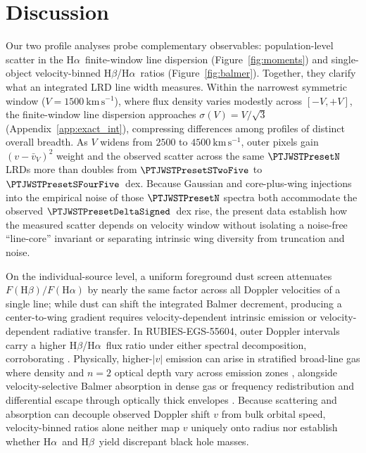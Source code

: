 \documentclass[twocolumn]{aastex631}
\newcommand{\Ha}{\ensuremath{\mathrm{H}\alpha}}
\newcommand{\Hb}{\ensuremath{\mathrm{H}\beta}}
\newcommand{\kms}{\ensuremath{\mathrm{km\,s^{-1}}}}
\newcommand{\sigV}{\ensuremath{\sigma(V)}}
\begin{document}
\section{Discussion}
\label{sec:discussion}

Our two profile analyses probe complementary observables: population-level scatter in the \Ha\ finite-window line dispersion (Figure~\ref{fig:moments}) and single-object velocity-binned \Hb/\Ha\ ratios (Figure~\ref{fig:balmer}). Together, they clarify what an integrated LRD line width measures. Within the narrowest symmetric window ($V = 1500~\kms$), where flux density varies modestly across $[-V, +V]$, the finite-window line dispersion approaches $\sigV = V/\sqrt{3}$ (Appendix~\ref{app:exact_int}), compressing differences among profiles of distinct overall breadth. As $V$ widens from $2500$ to $4500~\kms$, outer pixels gain $(v - \bar{v}_V)^2$ weight and the observed scatter across the same $\PTJWSTPresetN$ LRDs more than doubles from $\PTJWSTPresetSTwoFive$ to $\PTJWSTPresetSFourFive$~dex. Because Gaussian and core-plus-wing injections into the empirical noise of those $\PTJWSTPresetN$ spectra both accommodate the observed $\PTJWSTPresetDeltaSigned$~dex rise, the present data establish how the measured scatter depends on velocity window without isolating a noise-free ``line-core'' invariant or separating intrinsic wing diversity from truncation and noise.

On the individual-source level, a uniform foreground dust screen attenuates $F(\Hb)/F(\Ha)$ by nearly the same factor across all Doppler velocities of a single line; while dust can shift the integrated Balmer decrement, producing a center-to-wing gradient requires velocity-dependent intrinsic emission or velocity-dependent radiative transfer. In RUBIES-EGS-55604, outer Doppler intervals carry a higher \Hb/\Ha\ flux ratio under either spectral decomposition, corroborating \citet{Chen2026}. Physically, higher-$|v|$ emission can arise in stratified broad-line gas where density and $n=2$ optical depth vary across emission zones \citep{OsterbrockFerland2006,InayoshiMaiolino2025,Chen2026,Madau2026b,Scholtz2026}, alongside velocity-selective Balmer absorption in dense gas \citep{deGraaffRuby2025,DEugenio2026,Matthee2026} or frequency redistribution and differential escape through optically thick envelopes \citep[][and the review by \citealt{InayoshiHo}]{Laor2006,Brazzini2025,Rusakov2026,Chang2025,NaiduBHStar2026,deGraaff2026}. Because scattering and absorption can decouple observed Doppler shift $v$ from bulk orbital speed, velocity-binned ratios alone neither map $v$ uniquely onto radius nor establish whether \Ha\ and \Hb\ yield discrepant black hole masses.
\end{document}
